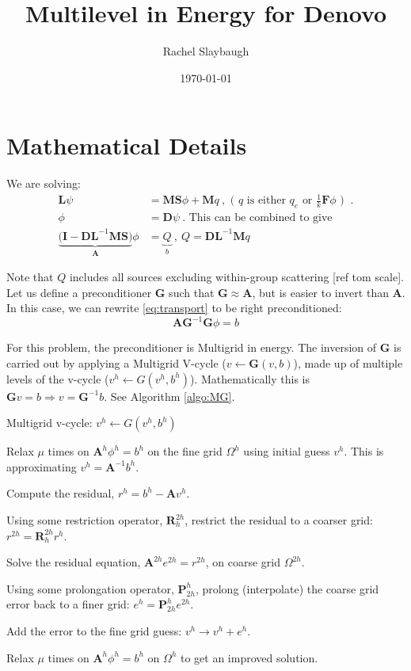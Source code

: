 \documentclass[12pt, letterpaper]{article}
\date{\today}
\title{Multilevel in Energy for Denovo}
\author{Rachel Slaybaugh}
\newcommand{\ve}[1]{\ensuremath{\mathbf{#1}}}
\begin{document}
\maketitle

\section{Mathematical Details}
We are solving:
%
\begin{align}
  \ve{L}\psi &= \ve{MS}\phi +  \ve{M}q\:,  \text{ ( } q \text{ is either }  q_{e} \text{ or } \frac{1}{k}\ve{F}\phi \text{ ) }\:. \\
  \phi &= \ve{D}\psi \:. \text{ This can be combined to give} \\
  \underbrace{\bigl( \ve{I} - \ve{DL}^{-1}\ve{MS} \bigr)}_{\ve{A}} \phi &= \underbrace{Q}_{b} \:, \: Q = \ve{DL}^{-1}\ve{M}q
  \label{eq:transport}
\end{align}

Note that $Q$ includes all sources excluding within-group scattering [ref tom scale]. Let us define a preconditioner $\ve{G}$ such that $\ve{G} \approx \ve{A}$, but is easier to invert than $\ve{A}$. In this case, we can rewrite \eqref{eq:transport} to be right preconditioned:
%
\begin{equation}
  \ve{A} \ve{G}^{-1} \ve{G} \phi = b
  \label{eq:precondTrans}
\end{equation}

For this problem, the preconditioner is Multigrid in energy. The inversion of $\ve{G}$ is carried out by applying a Multigrid V-cycle ($v \leftarrow \ve{G}(v, b)$), made up of multiple levels of the v-cycle ($v^h \leftarrow G(v^h, b^h)$). Mathematically this is $\ve{G}v = b \Rightarrow v = \ve{G}^{-1}b$. See Algorithm \ref{algo:MG}.
%
\begin{algorithm}
  \caption{ Multigrid v-cycle: $v^h \leftarrow G(v^h, b^h)$}
  \label{algo:MG}
  \begin{list}{}{\hspace{2em}}
    \item Relax $\mu$ times on $\ve{A}^h \phi^h = b^h$ on the fine grid $\Omega^h$ using initial guess $v^h$. This is approximating $v^{h} = \ve{A}^{-1}b^{h}$. 
    \item Compute the residual, $r^h = b^h - \ve{A} v^h$. 
    \item Using some restriction operator, $\ve{R}_h^{2h}$, restrict the residual to a coarser grid: $r^{2h} =  \ve{R}_h^{2h} r^h$. 
    \item Solve the residual equation, $\ve{A}^{2h} e^{2h} = r^{2h}$, on coarse grid $\Omega^{2h}$. 
    \item Using some prolongation operator, $\ve{P}_{2h}^h$, prolong (interpolate) the coarse grid error back to a finer grid: $e^h = \ve{P}_{2h}^h e^{2h}$. 
    \item Add the error to the fine grid guess: $v^h \rightarrow v^h + e^h$. 
    \item Relax $\mu$ times on $\ve{A}^h \phi^h = b^h$ on $\Omega^h$ to get an improved solution. 
  \end{list} 
\end{algorithm}
%
\end{document}
